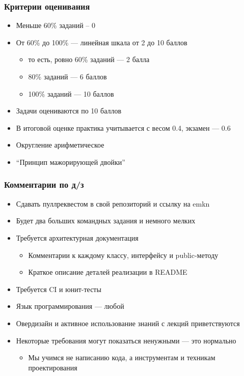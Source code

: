 \documentclass{../../slides-style}
\begin{document}
    \begin{frame}
        \frametitle{Критерии оценивания}
        \begin{itemize}
            \item Меньше 60\% заданий -- 0
            \item От 60\% до 100\% --- линейная шкала от 2 до 10 баллов
            \begin{itemize}
                \item то есть, ровно 60\% заданий --- 2 балла
                \item 80\% заданий --- 6 баллов
                \item 100\% заданий --- 10 баллов
            \end{itemize}
            \item Задачи оцениваются по 10 баллов
            \item В итоговой оценке практика учитывается с весом 0.4, экзамен --- 0.6
            \item Округление арифметическое
            \item ``Принцип мажорирующей двойки''
        \end{itemize}
    \end{frame}

    \begin{frame}
        \frametitle{Комментарии по д/з}
        \begin{itemize}
            \item Сдавать пуллреквестом в свой репозиторий и ссылку на emkn
            \item Будет два больших командных задания и немного мелких
            \item Требуется архитектурная документация
            \begin{itemize}
                \item Комментарии к каждому классу, интерфейсу и public-методу
                \item Краткое описание деталей реализации в README
            \end{itemize}
            \item Требуется CI и юнит-тесты
            \item Язык программирования --- любой
            \item Овердизайн и активное использование знаний с лекций приветствуются
            \item Некоторые требования могут показаться ненужными --- это нормально
            \begin{itemize}
                \item Мы учимся не написанию кода, а инструментам и техникам проектирования
            \end{itemize}
        \end{itemize}
    \end{frame}
\end{document}
